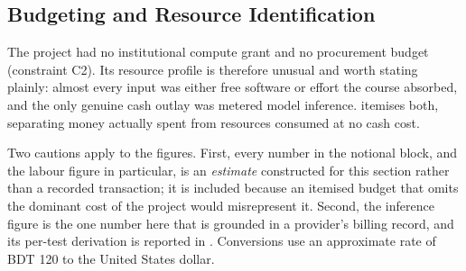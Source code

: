 \subsection{Budgeting and Resource Identification}
\label{sec:budget}

The project had no institutional compute grant and no procurement budget
(constraint C2). Its resource profile is therefore unusual and worth stating
plainly: almost every input was either free software or effort the course
absorbed, and the only genuine cash outlay was metered model inference.
 itemises both, separating money actually spent from resources
consumed at no cash cost.

Two cautions apply to the figures. First, every number in the notional block,
and the labour figure in particular, is an \emph{estimate} constructed for this
section rather than a recorded transaction; it is included because an itemised
budget that omits the dominant cost of the project would misrepresent it.
Second, the inference figure is the one number here that is grounded in a
provider's billing record, and its per-test derivation is reported in
. Conversions use an approximate rate of BDT 120 to the
United States dollar.

